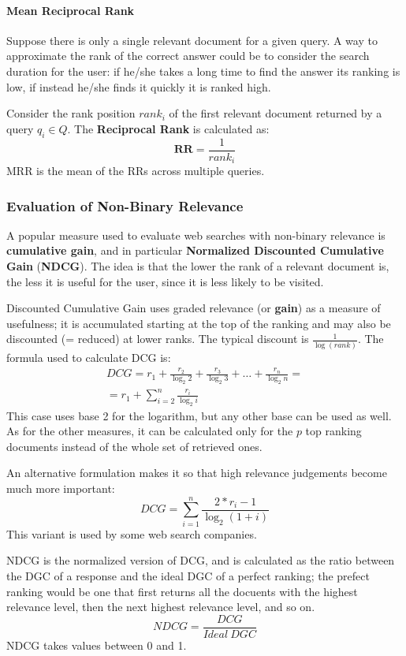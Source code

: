 \paragraph{Mean Reciprocal Rank}

Suppose there is only a single relevant document for a given query. A way to approximate the rank of the correct answer could be to consider the search duration for the user: if he/she takes a long time to find the answer its ranking is low, if instead he/she finds it quickly it is ranked high.

Consider the rank position $\textit{rank}_i$ of the first relevant document returned by a query $q_i \in Q$. The \textbf{Reciprocal Rank} is calculated as:
\begin{equation*}
    \textbf{RR} = \frac{1}{\textit{rank}_i}
\end{equation*}
MRR is the mean of the RRs across multiple queries.

\subsubsection{Evaluation of Non-Binary Relevance}

A popular measure used to evaluate web searches with non-binary relevance is \textbf{cumulative gain}, and in particular \textbf{Normalized Discounted Cumulative Gain} (\textbf{NDCG}). The idea is that the lower the rank of a relevant document is, the less it is useful for the user, since it is less likely to be visited.

Discounted Cumulative Gain uses graded relevance (or \textbf{gain}) as a measure of usefulness; it is accumulated starting at the top of the ranking and may also be discounted (= reduced) at lower ranks. The typical discount is $\frac{1}{\log(\textit{rank})}$. The formula used to calculate DCG is:
\begin{gather*}
    \textit{DCG} = r_1 + \frac{r_2}{\log_2 2} + \frac{r_3}{\log_2 3} + \dots + \frac{r_n}{\log_2 n} = \\
    = r_1 + \sum_{i=2}^n \frac{r_i}{\log_2 i}
\end{gather*}
This case uses base 2 for the logarithm, but any other base can be used as well. As for the other measures, it can be calculated only for the $p$ top ranking documents instead of the whole set of retrieved ones.

An alternative formulation makes it so that high relevance judgements become much more important:
\begin{equation*}
    \textit{DCG} = \sum_{i=1}^n \frac{2*{r_i} - 1}{\log_2(1+i)}
\end{equation*}
This variant is used by some web search companies.

NDCG is the normalized version of DCG, and is calculated as the ratio between the DGC of a response and the ideal DGC of a perfect ranking; the prefect ranking would be one that first returns all the docuents with the highest relevance level, then the next highest relevance level, and so on.
\begin{equation*}
    \textit{NDCG} = \frac{DCG}{\textit{Ideal} \ DGC}
\end{equation*}
NDCG takes values between 0 and 1.